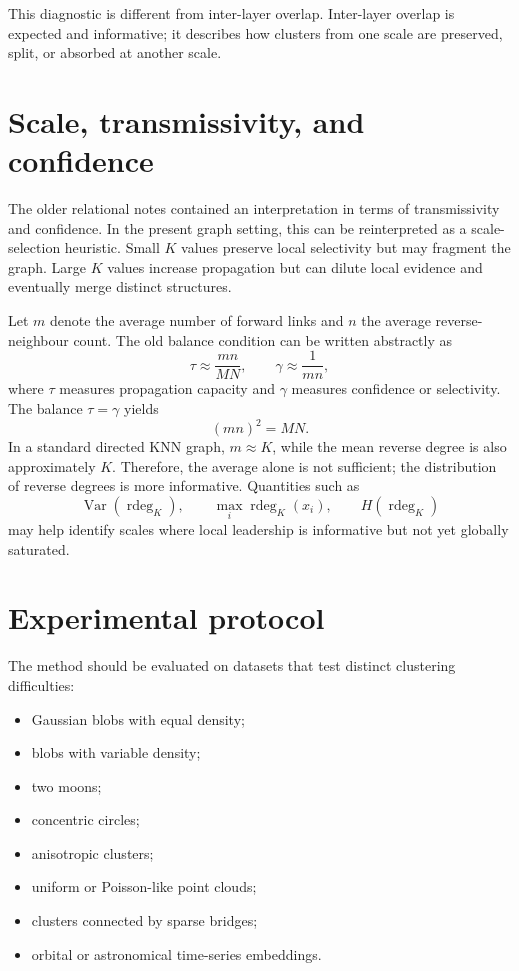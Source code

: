 \documentclass[pdflatex,sn-mathphys-num]{sn-jnl}
\newcommand{\rdeg}{\operatorname{rdeg}}
\begin{document}
This diagnostic is different from inter-layer overlap. Inter-layer overlap is expected and informative; it describes how clusters from one scale are preserved, split, or absorbed at another scale.

\section{Scale, transmissivity, and confidence}\label{sec:scale}

The older relational notes contained an interpretation in terms of transmissivity and confidence. In the present graph setting, this can be reinterpreted as a scale-selection heuristic. Small $K$ values preserve local selectivity but may fragment the graph. Large $K$ values increase propagation but can dilute local evidence and eventually merge distinct structures.

Let $m$ denote the average number of forward links and $n$ the average reverse-neighbour count. The old balance condition can be written abstractly as
\begin{equation}
\tau\approx \frac{mn}{MN},\qquad \gamma\approx\frac{1}{mn},
\end{equation}
where $\tau$ measures propagation capacity and $\gamma$ measures confidence or selectivity. The balance $\tau=\gamma$ yields
\begin{equation}
(mn)^2=MN.
\end{equation}
In a standard directed KNN graph, $m\approx K$, while the mean reverse degree is also approximately $K$. Therefore, the average alone is not sufficient; the distribution of reverse degrees is more informative. Quantities such as
\begin{equation}
\operatorname{Var}(\rdeg_K),\qquad \max_i\rdeg_K(x_i),\qquad H(\rdeg_K)
\end{equation}
may help identify scales where local leadership is informative but not yet globally saturated.

\section{Experimental protocol}\label{sec:experimental_protocol}

The method should be evaluated on datasets that test distinct clustering difficulties:
\begin{itemize}
    \item Gaussian blobs with equal density;
    \item blobs with variable density;
    \item two moons;
    \item concentric circles;
    \item anisotropic clusters;
    \item uniform or Poisson-like point clouds;
    \item clusters connected by sparse bridges;
    \item orbital or astronomical time-series embeddings.
\end{itemize}
\end{document}
